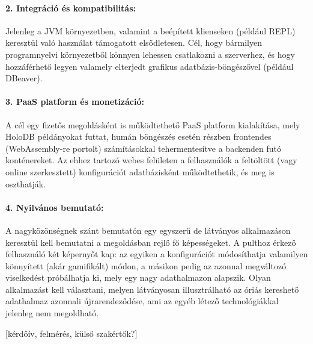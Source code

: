 \documentclass[12pt]{article}
\begin{document}
\paragraph{2. Integráció és kompatibilitás:}{
Jelenleg a JVM környezetben, valamint a beépített klienseken (például REPL) keresztül való használat támogatott elsődletesen.
Cél, hogy bármilyen programnyelvi környezetből könnyen lehessen csatlakozni a szerverhez,
és hogy hozzáférhető legyen valamely elterjedt grafikus adatbázis-böngészővel (például DBeaver).
}

\paragraph{3. PaaS platform és monetizáció:}{
A cél egy fizetős megoldásként is működtethető \mbox{PaaS} platform kialakítása,
mely HoloDB példányokat futtat,
humán böngészés esetén részben frontendes (WebAssembly-re portolt) számításokkal tehermentesítve a backenden futó konténereket.
Az ehhez tartozó webes felületen a felhasználók a feltöltött (vagy online szerkesztett)
konfigurációt adatbázisként működtethetik, és meg is oszthatják.
}

\paragraph{4. Nyilvános bemutató:}{
A nagyközönségnek szánt bemutatón egy egyszerű de látványos alkalmazáson keresztül kell bemutatni a megoldásban rejlő fő képességeket.
A pulthoz érkező felhasználó két képernyőt kap:
az egyiken a konfigurációt módosíthatja valamilyen könnyített (akár gamifikált) módon,
a másikon pedig az azonnal megváltozó viselkedést próbálhatja ki, mely egy nagy adathalmazon alapszik.
Olyan alkalmazást kell választani, melyen látványosan illusztrálható az óriás kereshető adathalmaz azonnali újrarendeződése,
ami az egyéb létező technológiákkal jelenleg nem megoldható.
}

[kérdőív, felmérés, külső szakértők?]
\end{document}
